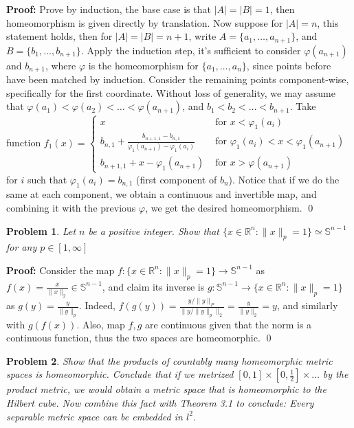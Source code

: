 \documentclass[12pt]{article}
\newtheorem{problem}{Problem}
\begin{document}
\textbf{Proof:} Prove by induction, the base case is that $|A|=|B|=1$, then homeomorphism is given directly by translation. Now suppose for $|A|=n$, this statement holds, then for $|A|=|B|=n+1$, write $A=\{a_{1}, \dots, a_{n+1}\}$, and $B=\{b_{1}, \dots, b_{n+1}\}$. Apply the induction step, it's sufficient to consider $\varphi(a_{n+1})$ and $b_{n+1}$, where $\varphi$ is the homeomorphism for $\{a_{1}, \dots, a_{n}\}$, since points before have been matched by induction. Consider the remaining points component-wise, specifically for the first coordinate. Without loss of generality, we may assume that $\varphi(a_{1}) < \varphi(a_{2}) <\dots < \varphi(a_{n+1})$, and $b_{1} < b_{2} < \dots < b_{n+1}$. Take function $f_{1}(x)=\begin{cases}
  x& \text{ for } x < \varphi_{1}(a_{i}) \\
  b_{n, 1}+\frac{b_{n+1, 1}-b_{n, 1}}{\varphi_{1}(a_{n+1})-\varphi_{1}(a_{i})}& \text{ for } \varphi_{1}(a_{i}) < x < \varphi_{1}(a_{n+1})\\
  b_{n+1, 1} + x - \varphi_{1}(a_{n+1})& \text{ for } x > \varphi(a_{n+1})
\end{cases}$ \\
for $i$ such that $\varphi_{1}(a_{i})=b_{n,1}$ (first component of $b_{n}$). Notice that if we do the same at each component, we obtain a continuous and invertible map, and combining it with the previous $\varphi$, we get the desired homeomorphism. \qed
\\
\begin{problem}
Let $n$ be a positive integer. Show that $\{x\in\mathbb{R}^{n}: \|x\|_{p}=1\}\simeq \mathbb{S}^{n-1}$ for any $p\in[1, \infty]$
\end{problem}

\textbf{Proof:} Consider the map $f: \{x\in\mathbb{R}^{n}: \|x\|_{p}=1\} \to \mathbb{S}^{n-1}$ as $f(x)=\frac{x}{\|x\|_{2}}\in \mathbb{S}^{n-1}$, and claim its inverse is 
 $g: \mathbb{S}^{n-1}\to \{x\in\mathbb{R}^{n}: \|x\|_{p}=1\}$ as $g(y)=\frac{y}{\|y\|_{p}}$. Indeed, $f(g(y))=\frac{y/\|y\|_{P}}{\|y/\|y\|_{p}\|_{2}}=\frac{y}{\|y\|_{2}}=y$, and similarly with $g(f(x))$. Also, map $f,g$ are continuous given that the norm is a continuous function, thus the two spaces are homeomorphic. \qed
\\
\begin{problem}
Show that the products of countably many homeomorphic metric spaces is homeomorphic. Conclude that if we metrized $[0,1]\times [0,\frac{1}{2}]\times \dots$ by the product metric, we would obtain a metric space that is homeomorphic to the Hilbert cube. Now combine this fact with Theorem 3.1 to conclude: Every separable metric space can be embedded in $l^{2}$.
\end{problem}
\end{document}
